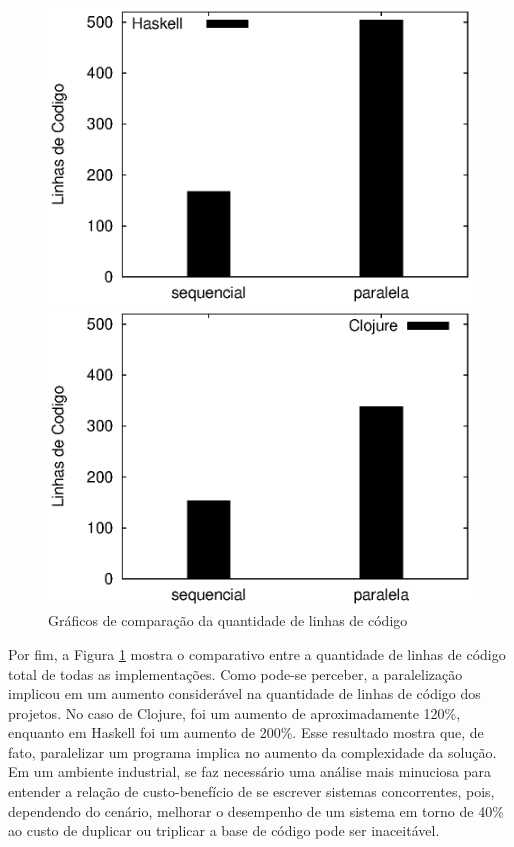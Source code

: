 \begin{figure}[!h]
 \begin{minipage}{0.5\textwidth}
  \centering
  \includegraphics[scale=0.63]{imagens/loc-haskell.eps}
 \end{minipage}
 \begin{minipage}{0.5\textwidth}
  \includegraphics[scale=0.63]{imagens/loc-clojure.eps}
 \end{minipage}
 \caption{Gráficos de comparação da quantidade de linhas de código}
 \label{fig:clj-hs-loc}
\end{figure}

Por fim, a Figura \ref{fig:clj-hs-loc} mostra o comparativo entre a quantidade de linhas de código total de todas as implementações. Como pode-se perceber, a paralelização implicou em um aumento considerável na quantidade de linhas de código dos projetos. No caso de Clojure, foi um aumento de aproximadamente 120\%, enquanto em Haskell foi um aumento de 200\%. Esse resultado mostra que, de fato, paralelizar um programa implica no aumento da complexidade da solução. Em um ambiente industrial, se faz necessário uma análise mais minuciosa para entender a relação de custo-benefício de se escrever sistemas concorrentes, pois, dependendo do cenário, melhorar o desempenho de um sistema em torno de 40\% ao custo de duplicar ou triplicar a base de código pode ser inaceitável.